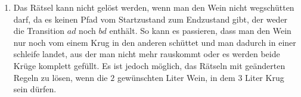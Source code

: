 \documentclass[a4paper]{scrartcl}
\begin{document}
\begin{enumerate}
\begin{enumerate}[label=(\alph*)]
            \item
                Das Rätsel kann nicht gelöst werden, wenn man den Wein nicht
                wegschütten darf, da es keinen Pfad vom Startzustand zum
                Endzustand gibt, der weder die Transition $ad$ noch $bd$
                enthält. So kann es passieren, dass man den Wein nur noch vom
                einem Krug in den anderen schüttet und man dadurch in einer
                schleife landet, aus der man nicht mehr rauskommt oder es
                werden beide Krüge komplett gefüllt. Es ist jedoch möglich,
                das Rätseln mit geänderten Regeln zu lösen, wenn die $2$
                gewünschten Liter Wein, in dem $3$ Liter Krug sein dürfen.

        \end{enumerate}

\end{enumerate}
\end{document}
